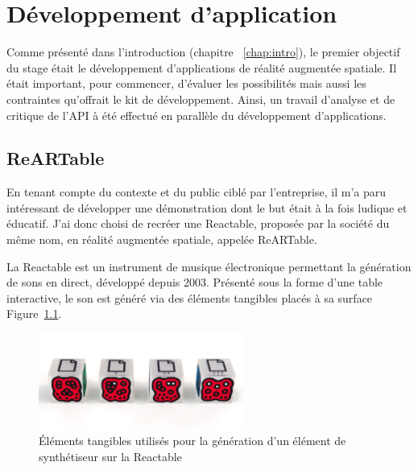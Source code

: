 \chapter{Développement d'application}

Comme présenté dans l'introduction (chapitre ~\ref{chap:intro}), le premier objectif du stage était le développement d'applications de réalité augmentée spatiale. Il était important, pour commencer, d'évaluer les possibilités mais aussi les contraintes qu'offrait le kit de développement. 
Ainsi, un travail d'analyse et de critique de l'API à été effectué en parallèle du développement d'applications.

\section{ReARTable}
\label{sec:reartable}
En tenant compte du contexte et du public ciblé par l'entreprise, il m'a paru intéressant de développer une démonstration dont le but était à la fois ludique et éducatif. J'ai donc choisi de recréer une Reactable\cite{reactable}, proposée par la société du même nom, en réalité augmentée spatiale, appelée ReARTable.

La Reactable est un instrument de musique électronique permettant la génération de sons en direct, développé depuis 2003. Présenté sous la forme d'une table interactive, le son est généré via des éléments tangibles placés à sa surface Figure~\ref{fig:reactelem}. 

\begin{figure}[H]
\centering
\includegraphics[width=0.6\textwidth]{images/reactelements}
\caption{Éléments tangibles utilisés pour la génération d'un élément de synthétiseur sur la Reactable\protect\footnotemark}
\label{fig:reactelem}
\end{figure}


